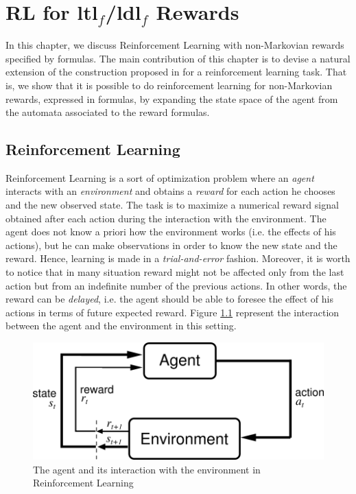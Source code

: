 \chapter{RL for {\sc ltl}$_f$/{\sc ldl}$_f$ Rewards}
\label{ch:rl}

In this chapter, we discuss Reinforcement Learning with non-Markovian rewards specified by \LLf formulas. The main contribution of this chapter is to devise a natural extension of the construction proposed in \citep{AAAI1817342} for a reinforcement learning task. That is, we show that it is possible to do reinforcement learning for non-Markovian rewards, expressed in \LLf formulas, by expanding the state space of the agent from the automata associated to the \LLf reward formulas.


\section{Reinforcement Learning}
\label{RL}
Reinforcement Learning \citep{Sutton:1998:IRL:551283} is a sort of optimization problem where an \emph{agent} interacts with an \emph{environment} and obtains a \emph{reward} for each action he chooses and the new observed state. The task is to maximize a numerical reward signal obtained after each action during the interaction with the environment. The agent does not know a priori how the environment works (i.e. the effects of his actions), but he can make observations in order to know the new state and the reward. Hence, learning is made in a \emph{trial-and-error} fashion. Moreover, it is worth to notice that in many situation reward might not be affected only from the last action but from an indefinite number of the previous actions. In other words, the reward can be \emph{delayed}, i.e. the agent should be able to foresee the effect of his actions in terms of future expected reward. Figure \ref{fig:agent-environment} represent the interaction between the agent and the environment in this setting.
\begin{figure}[!h]
	\centering
	\includegraphics[width=.8\linewidth]{images/agent-environment}
	\caption{The agent and its interaction with the environment in Reinforcement Learning}\label{fig:agent-environment}
\end{figure}

